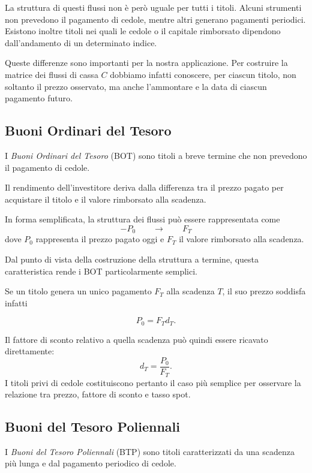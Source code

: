 La struttura di questi flussi non è però uguale per tutti i titoli.
Alcuni strumenti non prevedono il pagamento di cedole, mentre altri
generano pagamenti periodici. Esistono inoltre titoli nei quali le
cedole o il capitale rimborsato dipendono dall'andamento di un
determinato indice.

Queste differenze sono importanti per la nostra applicazione.
Per costruire la matrice dei flussi di cassa $C$ dobbiamo infatti
conoscere, per ciascun titolo, non soltanto il prezzo osservato, ma
anche l'ammontare e la data di ciascun pagamento futuro.


\subsection{Buoni Ordinari del Tesoro}

I \emph{Buoni Ordinari del Tesoro} (BOT) sono titoli a breve termine
che non prevedono il pagamento di cedole.

Il rendimento dell'investitore deriva dalla differenza tra il prezzo
pagato per acquistare il titolo e il valore rimborsato alla scadenza.

In forma semplificata, la struttura dei flussi può essere
rappresentata come
$$
-P_0
\qquad\longrightarrow\qquad
F_T
$$
dove $P_0$ rappresenta il prezzo pagato oggi e $F_T$ il valore
rimborsato alla scadenza.

Dal punto di vista della costruzione della struttura a termine,
questa caratteristica rende i BOT particolarmente semplici.

Se un titolo genera un unico pagamento $F_T$ alla scadenza $T$,
il suo prezzo soddisfa infatti

\begin{equation*}
    P_0=F_Td_T.
\end{equation*}

Il fattore di sconto relativo a quella scadenza può quindi essere
ricavato direttamente:
$$
	    d_T=\frac{P_0}{F_T}.
$$
I titoli privi di cedole costituiscono pertanto il caso più semplice
per osservare la relazione tra prezzo, fattore di sconto e tasso
spot.

\subsection{Buoni del Tesoro Poliennali}

I \emph{Buoni del Tesoro Poliennali} (BTP) sono titoli caratterizzati
da una scadenza più lunga e dal pagamento periodico di cedole.

